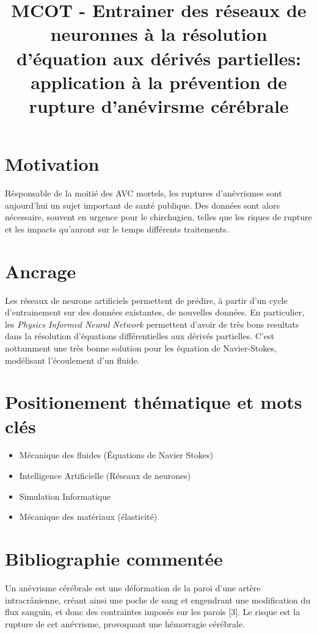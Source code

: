 \documentclass{article}
\title{MCOT - Entrainer des réseaux de neuronnes à la résolution d'équation aux dérivés partielles: application à la prévention de rupture d'anévirsme cérébrale}
\begin{document}
	\maketitle
	
	\section{Motivation}
	
Résponsable de la moitié des AVC mortels, les ruptures d'anévrismes sont aujourd'hui un sujet important de santé publique. 
Des données sont alors nécessaire, souvent en urgence pour le chirchugien, telles que les riques de rupture et les impacts qu'auront sur le temps différents traitements.
\section{Ancrage}
	
Les réseaux de neurone artificiels permettent de prédire, à partir d'un cycle d'entrainement sur des données existantes, de nouvelles données. 
En particulier, les \emph{Physics Informed Neural Network} permettent d'avoir de très bons resultats dans la résolution d'équations différentielles aux dérivés partielles. 
C'est nottamment une très bonne solution pour les équation de Navier-Stokes, modélisant l'écoulement d'un fluide.

	\section{Positionement thématique et mots clés}
	
\begin{itemize}
	\item Mécanique des fluides (Équations de Navier Stokes)
	\item Intelligence Artificielle (Réseaux de neurones)
	\item Simulation Informatique
	\item Mécanique des matériaux (élasticité)
\end{itemize}
	
	\section{Bibliographie commentée}
	
Un anévrisme cérébrale est une déformation de la paroi d'une artère intracrânienne, créant ainsi une poche de sang et engendrant une modification du flux sanguin, et donc des contraintes imposés sur les parois [3]. Le risque est la rupture de cet anévrisme, provoquant une hémorragie cérébrale. 
\end{document}
